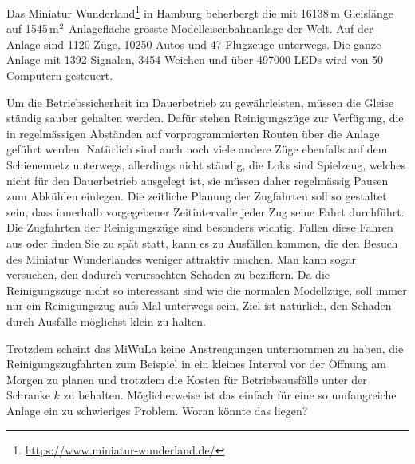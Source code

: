 Das Miniatur Wunderland\footnote{\url{https://www.miniatur-wunderland.de/}}
in Hamburg beherbergt die mit
16138\,m Gleislänge auf 1545\,m$\mathstrut^2$ Anlagefläche grösste
Modelleisenbahnanlage der Welt.
Auf der Anlage sind 1120 Züge, 10250 Autos und 47 Flugzeuge unterwegs.
Die ganze Anlage mit 1392 Signalen, 3454 Weichen und über 497000 LEDs
wird von 50 Computern gesteuert.

Um die Betriebssicherheit im Dauerbetrieb zu gewährleisten, müssen
die Gleise ständig sauber gehalten werden.
Dafür stehen Reinigungszüge zur Verfügung, die in regelmässigen
Abständen auf vorprogrammierten Routen über die Anlage geführt
werden.
Natürlich sind auch noch viele andere Züge ebenfalls auf dem Schienennetz
unterwegs, allerdings nicht ständig, die Loks sind Spielzeug, welches
nicht für den Dauerbetrieb ausgelegt ist, sie müssen daher regelmässig
Pausen zum Abkühlen einlegen.
Die zeitliche Planung der Zugfahrten soll so gestaltet sein, dass
innerhalb vorgegebener Zeitintervalle jeder Zug seine Fahrt durchführt.
Die Zugfahrten der Reinigungszüge sind besonders wichtig.
Fallen diese Fahren aus oder finden Sie zu spät statt, 
kann es zu Ausfällen kommen, die den Besuch des Miniatur Wunderlandes
weniger attraktiv machen.
Man kann sogar versuchen, den dadurch verursachten Schaden zu beziffern.
Da die Reinigungszüge nicht so interessant sind wie die normalen
Modellzüge, soll immer nur ein Reinigungszug aufs Mal unterwegs sein.
Ziel ist natürlich, den Schaden durch Ausfälle möglichst klein zu halten.

Trotzdem scheint das MiWuLa keine Anstrengungen unternommen zu haben, die
Reinigungszugfahrten zum Beispiel in ein kleines Interval vor der Öffnung
am Morgen zu planen und trotzdem die Kosten für Betriebsausfälle
unter der Schranke $k$ zu behalten.
Möglicherweise ist das einfach für eine so umfangreiche Anlage ein
zu schwieriges Problem.
Woran könnte das liegen?


